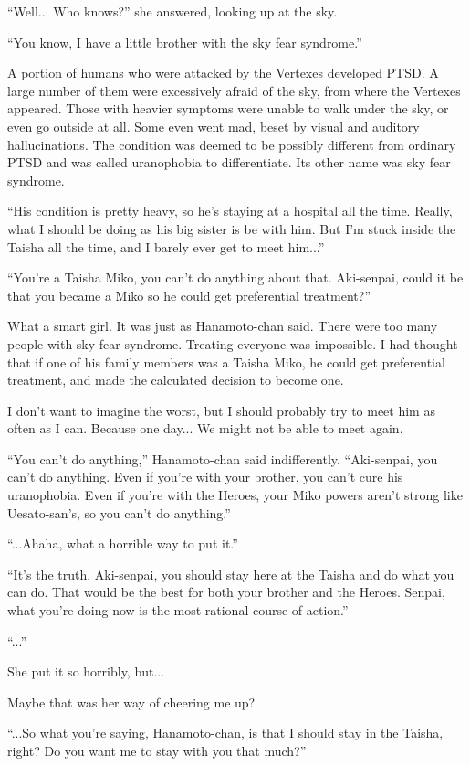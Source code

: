 ``Well... Who knows?'' she answered, looking up at the sky.

``You know, I have a little brother with the sky fear syndrome.''

A portion of humans who were attacked by the Vertexes developed PTSD. A large number of them were excessively afraid of the sky, from where the Vertexes appeared. Those with heavier symptoms were unable to walk under the sky, or even go outside at all. Some even went mad, beset by visual and auditory hallucinations. The condition was deemed to be possibly different from ordinary PTSD and was called uranophobia to differentiate. Its other name was sky fear syndrome.

``His condition is pretty heavy, so he's staying at a hospital all the time. Really, what I should be doing as his big sister is be with him. But I'm stuck inside the Taisha all the time, and I barely ever get to meet him...''

``You're a Taisha Miko, you can't do anything about that. Aki-senpai, could it be that you became a Miko so he could get preferential treatment?''

What a smart girl. It was just as Hanamoto-chan said. There were too many people with sky fear syndrome. Treating everyone was impossible. I had thought that if one of his family members was a Taisha Miko, he could get preferential treatment, and made the calculated decision to become one.

I don't want to imagine the worst, but I should probably try to meet him as often as I can. Because one day... We might not be able to meet again.

``You can't do anything,''  Hanamoto-chan said indifferently.  ``Aki-senpai, you can't do anything. Even if you're with your brother, you can't cure his uranophobia. Even if you're with the Heroes, your Miko powers aren't strong like Uesato-san's, so you can't do anything.''

``...Ahaha, what a horrible way to put it.''

``It's the truth. Aki-senpai, you should stay here at the Taisha and do what you can do. That would be the best for both your brother and the Heroes. Senpai, what you're doing now is the most rational course of action.''

``...''

She put it so horribly, but...

Maybe that was her way of cheering me up?

``...So what you're saying, Hanamoto-chan, is that I should stay in the Taisha, right? Do you want me to stay with you that much?''

